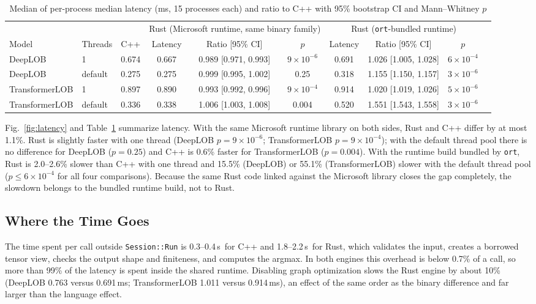 \documentclass[conference]{IEEEtran}
\newcommand{\ms}{\,ms}
\newcommand{\us}{\,\textmu s}
\begin{document}
\begin{table}[t]
\caption{Median of per-process median latency (ms, 15 processes each) and ratio to C++ with 95\% bootstrap CI and Mann--Whitney $p$}
\label{tab:latency}
\centering
\footnotesize
\setlength{\tabcolsep}{4pt}
\begin{tabular}{@{}llcccccccc@{}}
\toprule
 & & & \multicolumn{3}{c}{Rust (Microsoft runtime, same binary family)} & \multicolumn{3}{c}{Rust (\texttt{ort}-bundled runtime)} \\
\cmidrule(lr){4-6}\cmidrule(lr){7-9}
Model & Threads & C++ & Latency & Ratio [95\% CI] & $p$ & Latency & Ratio [95\% CI] & $p$ \\
\midrule
DeepLOB & 1 & 0.674 & 0.667 & 0.989 [0.971, 0.993] & $9\times10^{-6}$ & 0.691 & 1.026 [1.005, 1.028] & $6\times10^{-4}$ \\
DeepLOB & default & 0.275 & 0.275 & 0.999 [0.995, 1.002] & 0.25 & 0.318 & 1.155 [1.150, 1.157] & $3\times10^{-6}$ \\
TransformerLOB & 1 & 0.897 & 0.890 & 0.993 [0.992, 0.996] & $9\times10^{-4}$ & 0.914 & 1.020 [1.019, 1.026] & $5\times10^{-6}$ \\
TransformerLOB & default & 0.336 & 0.338 & 1.006 [1.003, 1.008] & 0.004 & 0.520 & 1.551 [1.543, 1.558] & $3\times10^{-6}$ \\
\bottomrule
\end{tabular}
\end{table}

Fig.~\ref{fig:latency} and Table~\ref{tab:latency} summarize latency. With the same Microsoft runtime library on both sides, Rust and C++ differ by at most 1.1\%. Rust is slightly faster with one thread (DeepLOB $p=9\times10^{-6}$; TransformerLOB $p=9\times10^{-4}$); with the default thread pool there is no difference for DeepLOB ($p=0.25$) and C++ is 0.6\% faster for TransformerLOB ($p=0.004$). With the runtime build bundled by \texttt{ort}, Rust is 2.0--2.6\% slower than C++ with one thread and 15.5\% (DeepLOB) or 55.1\% (TransformerLOB) slower with the default thread pool ($p\le6\times10^{-4}$ for all four comparisons). Because the same Rust code linked against the Microsoft library closes the gap completely, the slowdown belongs to the bundled runtime build, not to Rust.

\subsection{Where the Time Goes}

The time spent per call outside \texttt{Session::Run} is 0.3--0.4\us\ for C++ and 1.8--2.2\us\ for Rust, which validates the input, creates a borrowed tensor view, checks the output shape and finiteness, and computes the argmax. In both engines this overhead is below 0.7\% of a call, so more than 99\% of the latency is spent inside the shared runtime. Disabling graph optimization slows the Rust engine by about 10\% (DeepLOB 0.763 versus 0.691\ms; TransformerLOB 1.011 versus 0.914\ms), an effect of the same order as the binary difference and far larger than the language effect.
\end{document}
